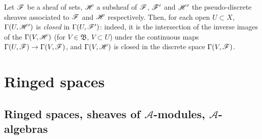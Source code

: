 \begin{env}[3.8.3]
\label{env-0.3.8.3}
Let $\mathscr{F}$ be a sheaf of sets, $\mathscr{H}$ a subsheaf of $\mathscr{F}$, $\mathscr{F}'$ and
$\mathscr{H}'$ the pseudo-discrete sheaves associated to $\mathscr{F}$ and $\mathscr{H}$
respectively. Then, for each open $U\subset X$, $\Gamma(U,\mathscr{H}')$ is
{\em closed} in $\Gamma(U,\mathscr{F}')$: indeed, it is the intersection of the
inverse images of the $\Gamma(V,\mathscr{H})$ (for $V\in\mathfrak{B}$, $V\subset U$)
under the continuous maps $\Gamma(U,\mathscr{F})\to\Gamma(V,\mathscr{F})$, and
$\Gamma(V,\mathscr{H})$ is closed in the discrete space $\Gamma(V,\mathscr{F})$.
\end{env}

\section{Ringed spaces}
\label{section-ringed-spaces}

\subsection{Ringed spaces, sheaves of $\mathcal{A}$-modules, $\mathcal{A}$-algebras}
\label{subsection-ringed-spaces-sheaves-of-modules-and-algebras}

